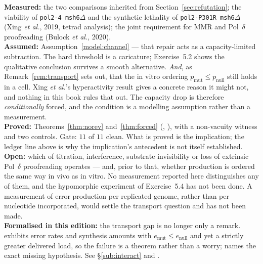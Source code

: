 \begin{ledger}
\textbf{Measured:} the two comparisons inherited from
Section~\ref{sec:refutation}; the viability of \texttt{pol2-4 msh6$\Delta$} and
the synthetic lethality of \texttt{pol2-P301R msh6$\Delta$} (Xing \emph{et al.},
2019, tetrad analysis); the joint requirement for MMR and Pol~$\delta$
proofreading (Bulock \emph{et al.}, 2020). \\
\textbf{Assumed:} Assumption~\ref{model:channel} --- that repair acts as a
capacity-limited subtraction. The hard threshold is a caricature; Exercise~5.2
shows the qualitative conclusion survives a smooth alternative. \emph{And}, as
Remark~\ref{rem:transport} sets out, that the in vitro ordering
$p_{\mathrm{mut}} \le p_{\mathrm{null}}$ still holds in a cell. Xing
\emph{et al.}'s hyperactivity result gives a concrete reason it might not, and
nothing in this book rules that out. The capacity drop is therefore
\emph{conditionally} forced, and the condition is a modelling assumption rather
than a measurement. \\
\textbf{Proved:} Theorems~\ref{thm:norev} and~\ref{thm:forced}
(, ),
with a non-vacuity witness and two controls. Gate: $11$ of $11$ clean. What is
proved is the implication; the ledger line above is why the implication's
antecedent is not itself established. \\
\textbf{Open:} which of titration, interference, substrate invisibility or loss
of extrinsic Pol~$\delta$ proofreading operates --- and, prior to that, whether
production is ordered the same way in vivo as in vitro. No measurement reported
here distinguishes any of them, and the hypomorphic experiment of
Exercise~5.4 has not been done. A measurement of error production per replicated
genome, rather than per nucleotide incorporated, would settle the transport
question and has not been made. \\
\textbf{Formalised in this edition:} the transport gap is no longer only a
remark.  exhibits error rates and
synthesis amounts with $e_{\mathrm{mut}} \le e_{\mathrm{null}}$ and yet a
strictly greater delivered load, so the failure is a theorem rather than a
worry;  names the exact missing
hypothesis. See \S\ref{sub:interact} and
.
\end{ledger}
